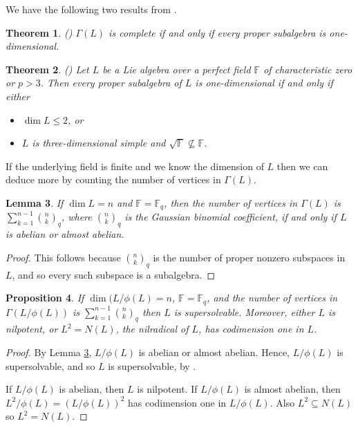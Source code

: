 \documentclass[11pt]{amsart}
\theoremstyle{plain}
\newtheorem{theorem}{Theorem}[section]
\newtheorem{proposition}[theorem]{Proposition}
\newtheorem{lemma}[theorem]{Lemma}
\def\F{\mathbb{F}}
\begin{document}
We have the following two results from \cite{TZG}.

\begin{theorem}(\cite[Theorem 3.3]{TZG})
$\Gamma(L)$ is complete if and only if every proper subalgebra is one-dimensional.
\end{theorem}

\begin{theorem}\label{p:gen} (\cite[Theorem 3.4]{TZG})
Let $L$ be a Lie algebra over a perfect field $\mathbb{F}$ of characteristic zero or $p>3$. Then every proper subalgebra of $L$ is one-dimensional if and only if either
\begin{itemize}
\item[(i)] $\dim L\leq 2$, or
\item[(ii)] $L$ is three-dimensional simple and $\sqrt{\mathbb{F}} \not \subseteq \mathbb{F}$. 
\end{itemize}
\end{theorem}
\medskip


If the underlying field is finite and we know the dimension of $L$ then we can deduce more by counting the number of vertices in $\Gamma(L)$.

\begin{lemma}\label{abalab}
If $\dim L=n$ and $\F=\F_q$, then the number of vertices in $\Gamma(L)$ is $\sum_{k=1}^{n-1}\binom{n}{k}_q$, where $\binom{n}{k}_q$ is the Gaussian binomial coefficient, if and only if $L$ is abelian or almost abelian.
\end{lemma}
\begin{proof}
This follows because $\binom{n}{k}_q$ is the number of proper nonzero subspaces in $L$, and so every such subspace is a subalgebra.
\end{proof}

\begin{proposition} If $\dim (L/\phi(L)=n$, $\F=\F_q$, and the number of vertices in $\Gamma(L/\phi(L))$ is $\sum_{k=1}^{n-1}\binom{n}{k}_q$ then $L$ is supersolvable. Moreover, either $L$ is nilpotent, or $L^2=N(L)$, the nilradical of $L$, has codimension one in $L$.  
\end{proposition}
\begin{proof} By Lemma \ref{abalab}, $L/\phi(L)$ is abelian or almost abelian. Hence, $L/\phi(L)$ is supersolvable, and so $L$ is supersolvable, by \cite[Theorem 6]{barnes}.
\par

If $L/\phi(L)$ is abelian, then $L$ is nilpotent. If $L/\phi(L)$ is almost abelian, then $L^2/\phi(L)=(L/\phi(L))^2$ has codimension one in $L/\phi(L)$. Also $L^2\subseteq N(L)$ so $L^2=N(L)$.
\end{proof}
\end{document}
